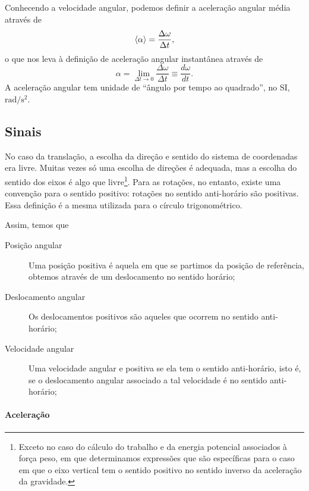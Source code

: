 Conhecendo a velocidade angular, podemos definir a aceleração angular média através de
\begin{equation}
	\left\langle{\alpha}\right\rangle = \frac{\Delta \omega}{\Delta t},
\end{equation}
%
o que nos leva à definição de aceleração angular instantânea através de
\begin{equation}
	\alpha = \lim_{\Delta t \to 0} \frac{\Delta\omega}{\Delta t} \equiv \frac{d\omega}{dt}.
\end{equation}
%
A aceleração angular tem unidade de ``ângulo por tempo ao quadrado'', no SI, $\textrm{rad}/\textrm{s}^2$.

\subsection{Sinais}

No caso da translação, a escolha da direção e sentido do sistema de coordenadas era livre. Muitas vezes só uma escolha de direções é adequada, mas a escolha do sentido dos eixos é algo que livre\footnote{Exceto no caso do cálculo do trabalho e da energia potencial associados à força peso, em que determinamos expressões que são específicas para o caso em que o eixo vertical tem o sentido positivo no sentido inverso da aceleração da gravidade.}. Para as rotações, no entanto, existe uma convenção para o sentido positivo: rotações no sentido anti-horário são positivas. Essa definição é a mesma utilizada para o círculo trigonométrico.

Assim, temos que
\begin{description}
    \item[Posição angular] Uma posição positiva é aquela em que se partimos da posição de referência, obtemos através de um deslocamento no sentido horário;
    \item[Deslocamento angular] Os deslocamentos positivos são aqueles que ocorrem no sentido anti-horário;
    \item[Velocidade angular] Uma velocidade angular e positiva se ela tem o sentido anti-horário, isto é, se o deslocamento angular associado a tal velocidade é no sentido anti-horário;
\end{description}

\paragraph{Aceleração}

